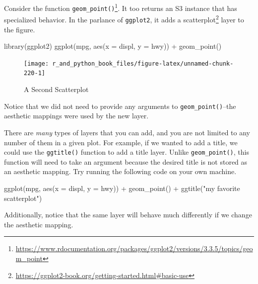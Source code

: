 \documentclass[
  12pt,
  krantz2]{krantz}
\makeatletter
\newenvironment{Shaded}{\begin{snugshade}}{\end{snugshade}}
\newcommand{\AttributeTok}[1]{\textcolor[rgb]{0.61,0.61,0.61}{#1}}
\newcommand{\FunctionTok}[1]{\textcolor[rgb]{0,0,0}{#1}}
\newcommand{\NormalTok}[1]{#1}
\newcommand{\SpecialCharTok}[1]{\textcolor[rgb]{0,0,0}{#1}}
\newcommand{\StringTok}[1]{\textcolor[rgb]{0.5,0.5,0.5}{#1}}
\renewcommand{\href}[2]{#2\footnote{\url{#1}}}
\newenvironment{kframe}{%
\medskip{}
\setlength{\fboxsep}{.8em}
 \def\at@end@of@kframe{}%
 \ifinner\ifhmode%
  \def\at@end@of@kframe{\end{minipage}}%
  \begin{minipage}{\columnwidth}%
 \fi\fi%
 \def\FrameCommand##1{\hskip\@totalleftmargin \hskip-\fboxsep
 \colorbox{shadecolor}{##1}\hskip-\fboxsep
     \hskip-\linewidth \hskip-\@totalleftmargin \hskip\columnwidth}%
 \MakeFramed {\advance\hsize-\width
   \@totalleftmargin\z@ \linewidth\hsize
   \@setminipage}}%
 {\par\unskip\endMakeFramed%
 \at@end@of@kframe}
\renewenvironment{Shaded}{\begin{kframe}}{\end{kframe}}
\makeatother
\begin{document}
Consider the function \href{https://www.rdocumentation.org/packages/ggplot2/versions/3.3.5/topics/geom_point}{\texttt{geom\_point()}}. It too returns an S3 instance that has specialized behavior. In the parlance of \texttt{ggplot2}, it adds a \href{https://ggplot2-book.org/getting-started.html\#basic-use}{scatterplot} layer to the figure.

\begin{Shaded}
\begin{Highlighting}[]
\FunctionTok{library}\NormalTok{(ggplot2)}
\FunctionTok{ggplot}\NormalTok{(mpg, }\FunctionTok{aes}\NormalTok{(}\AttributeTok{x =}\NormalTok{ displ, }\AttributeTok{y =}\NormalTok{ hwy))  }\SpecialCharTok{+}
  \FunctionTok{geom\_point}\NormalTok{()}
\end{Highlighting}
\end{Shaded}

\begin{figure}

{\centering \texttt{[image: r\_and\_python\_book\_files/figure-latex/unnamed-chunk-220-1]} 

}

\caption{A Second Scatterplot}\label{fig:unnamed-chunk-220}
\end{figure}

Notice that we did not need to provide any arguments to \texttt{geom\_point()}--the aesthetic mappings were used by the new layer.

There are \emph{many} types of layers that you can add, and you are not limited to any number of them in a given plot. For example, if we wanted to add a title, we could use the \texttt{ggtitle()} function to add a title layer. Unlike \texttt{geom\_point()}, this function will need to take an argument because the desired title is not stored as an aesthetic mapping. Try running the following code on your own machine.

\begin{Shaded}
\begin{Highlighting}[]
\FunctionTok{ggplot}\NormalTok{(mpg, }\FunctionTok{aes}\NormalTok{(}\AttributeTok{x =}\NormalTok{ displ, }\AttributeTok{y =}\NormalTok{ hwy))  }\SpecialCharTok{+}
  \FunctionTok{geom\_point}\NormalTok{() }\SpecialCharTok{+} 
  \FunctionTok{ggtitle}\NormalTok{(}\StringTok{"my favorite scatterplot"}\NormalTok{)}
\end{Highlighting}
\end{Shaded}

Additionally, notice that the same layer will behave much differently if we change the aesthetic mapping.
\end{document}
